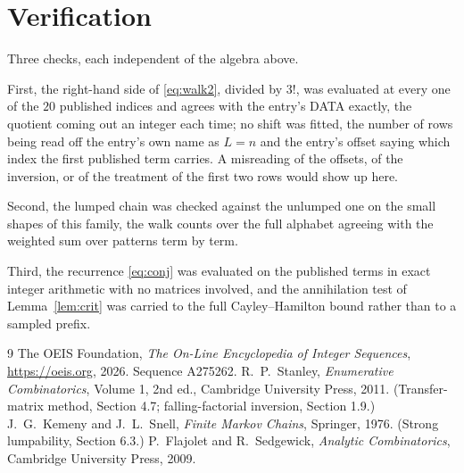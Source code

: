 \documentclass[11pt,a4paper]{article}
\theoremstyle{plain}
\theoremstyle{definition}
\begin{document}
\section{Verification}

Three checks, each independent of the algebra above.

First, the right-hand side of \eqref{eq:walk2}, divided by $3!$, was evaluated at every
one of the $20$ published indices and agrees with the entry's DATA exactly, the quotient
coming out an integer each time; no shift was fitted, the number of rows being read off the
entry's own name as $L=n$ and the entry's offset saying which index the first published
term carries. A misreading of the offsets, of the inversion, or of the treatment of the first
two rows would show up here.

Second, the lumped chain was checked against the unlumped one on the small shapes of this
family, the walk counts over the full alphabet agreeing with the weighted sum over patterns
term by term.

Third, the recurrence \eqref{eq:conj} was evaluated on the published terms in exact integer
arithmetic with no matrices involved, and the annihilation test of Lemma~\ref{lem:crit} was
carried to the full Cayley--Hamilton bound rather than to a sampled prefix.

\begin{thebibliography}{9}
 The OEIS Foundation, \emph{The On-Line Encyclopedia of Integer
Sequences}, \url{https://oeis.org}, 2026. Sequence A275262.
 R.~P.~Stanley, \emph{Enumerative Combinatorics}, Volume 1, 2nd ed.,
Cambridge University Press, 2011. (Transfer-matrix method, Section 4.7; falling-factorial
inversion, Section 1.9.)
 J.~G.~Kemeny and J.~L.~Snell, \emph{Finite Markov Chains}, Springer,
1976. (Strong lumpability, Section 6.3.)
 P.~Flajolet and R.~Sedgewick, \emph{Analytic Combinatorics}, Cambridge
University Press, 2009.
\end{thebibliography}
\end{document}
